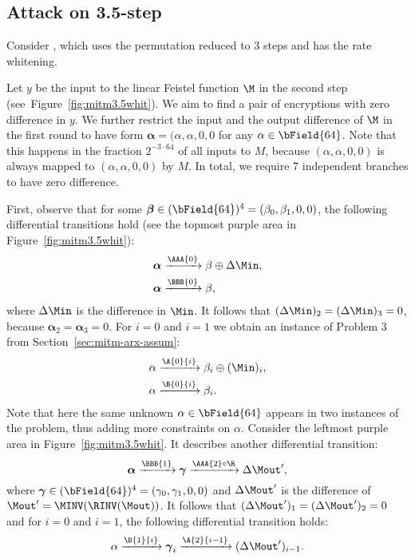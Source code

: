 \subsection{Attack on 3.5-step }

Consider , which uses the \aCipher{} permutation reduced to 3 steps and has the rate whitening.

\newcommand\aalpha{\boldsymbol{\alpha}}
\newcommand\bbeta{\boldsymbol{\beta}}
\newcommand\ggamma{\boldsymbol{\gamma}}
Let $y$ be the input to the linear Feistel function $\M$ in the second step (see~Figure~\ref{fig:mitm3.5whit}). We aim to find a pair of encryptions with zero difference in $y$. We further restrict the input and the output difference of $\M$ in the first round to have form $\aalpha=(\alpha, \alpha, 0, 0$ for any $\alpha \in \bField{64}$. Note that this happens in the fraction $2^{-3\cdot64}$ of all inputs to $M$, because $(\alpha,\alpha,0,0)$ is always mapped to $(\alpha,\alpha,0,0)$ by $M$. In total, we require 7 independent branches to have zero difference.

{}

First, observe that for some $\bbeta \in (\bField{64})^4 = (\beta_0, \beta_1, 0, 0)$, the following differential transitions hold (see the topmost purple area in Figure~\ref{fig:mitm3.5whit}):
\begin{align*}
&\aalpha \xrightarrow{\AAA{0}} \beta \oplus \Delta{\Min},\\
&\aalpha \xrightarrow{\BBB{0}} \beta,
\end{align*}
where $\Delta{\Min}$ is the difference in $\Min$. It follows that $(\Delta{\Min})_2 = (\Delta{\Min})_3 = 0$, because $\aalpha_2 = \aalpha_3 = 0$. For $i = 0$ and $i=1$ we obtain an instance of Problem 3 from Section~\ref{sec:mitm-arx-assum}:
\begin{align*}
&\alpha \xrightarrow{\A{0}{i}} \beta_i \oplus (\Min)_i, \\
&\alpha \xrightarrow{\B{0}{i}} \beta_i.
\end{align*}
Note that here the same unknown $\alpha \in \bField{64}$ appears in two instances of the problem, thus adding more constraints on $\alpha$.
Consider the leftmost purple area in Figure~\ref{fig:mitm3.5whit}. It describes another differential transition:
$$
\aalpha \xrightarrow{\BBB{1}} \ggamma \xrightarrow{\AAA{2}\circ\R} \Delta\Mout',
$$
where $\ggamma \in (\bField{64})^4 = (\gamma_0, \gamma_1, 0, 0)$ and $\Delta\Mout'$ is the difference of $\Mout' = \MINV (\RINV(\Mout))$. It follows that $(\Delta\Mout')_1 = (\Delta\Mout')_2 = 0$ and for $i = 0$ and $i=1$, the following differential transition holds:
$$
\alpha \xrightarrow{\B{1}{i}} \ggamma_i \xrightarrow{\A{2}{i-1}} (\Delta\Mout')_{i-1}.
$$

